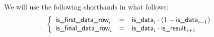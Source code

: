 We will use the following shorthands in what follows:
\[
	\left\{ \begin{array}{lcl}
		\textsf{is\_first\_data\_row} _{i} & = & \textsf{is\_data}   _{i} \cdot (1 - \textsf{is\_data}   _{i - 1}) \\
		\textsf{is\_final\_data\_row} _{i} & = & \textsf{is\_data}   _{i} \cdot \textsf{is\_result} _{i + 1}       \\
	\end{array} \right.
\]
